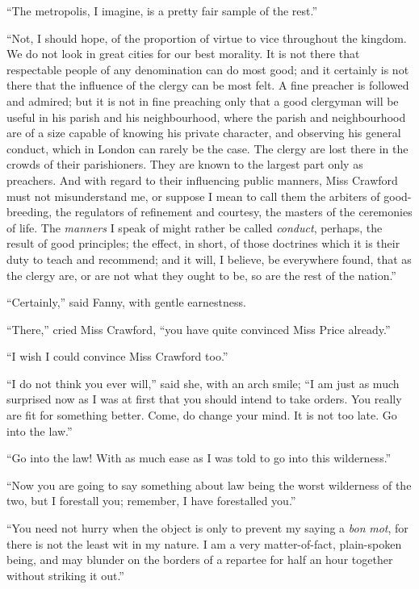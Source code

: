 \documentclass{article}
\begin{document}
``The metropolis, I imagine, is a pretty fair sample
of the rest.''

``Not, I should hope, of the proportion of virtue to vice
throughout the kingdom.  We do not look in great cities
for our best morality.  It is not there that respectable
people of any denomination can do most good; and it
certainly is not there that the influence of the clergy can
be most felt.  A fine preacher is followed and admired;
but it is not in fine preaching only that a good clergyman
will be useful in his parish and his neighbourhood,
where the parish and neighbourhood are of a size capable
of knowing his private character, and observing his
general conduct, which in London can rarely be the case.
The clergy are lost there in the crowds of their parishioners.
They are known to the largest part only as preachers.
And with regard to their influencing public manners,
Miss Crawford must not misunderstand me, or suppose I mean
to call them the arbiters of good-breeding, the regulators
of refinement and courtesy, the masters of the ceremonies
of life.  The \emph{manners} I speak of might rather be
called \emph{conduct}, perhaps, the result of good principles;
the effect, in short, of those doctrines which it
is their duty to teach and recommend; and it will,
I believe, be everywhere found, that as the clergy are,
or are not what they ought to be, so are the rest of
the nation.''

``Certainly,'' said Fanny, with gentle earnestness.

``There,'' cried Miss Crawford, ``you have quite convinced
Miss Price already.''

``I wish I could convince Miss Crawford too.''

``I do not think you ever will,'' said she, with an arch smile;
``I am just as much surprised now as I was at first
that you should intend to take orders.  You really are
fit for something better.  Come, do change your mind.
It is not too late.  Go into the law.''

``Go into the law!  With as much ease as I was told to go
into this wilderness.''

``Now you are going to say something about law being
the worst wilderness of the two, but I forestall you;
remember, I have forestalled you.''

``You need not hurry when the object is only to prevent
my saying a \emph{bon} \emph{mot}, for there is not the least wit in
my nature.  I am a very matter-of-fact, plain-spoken being,
and may blunder on the borders of a repartee for half
an hour together without striking it out.''
\end{document}
